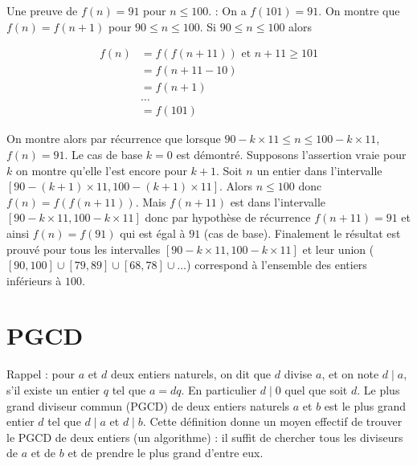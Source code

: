 \begin{newenu}
\begin{correction}
Une preuve de $f(n) = 91$ pour $n \leq 100$. :
 On a $f(101) = 91$. On montre que $f(n) = f(n + 1)$ pour $90 \leq n
  \leq 100$. Si $90 \leq n \leq 100$ alors

\begin{align*}
  f(n) &= f(f(n + 11)) \text{ et } n+11 \geq 101 \\
  &= f(n + 11 - 10) \\
  &= f(n + 1)\\
  & \ldots\\
  &= f(101)
\end{align*}

On montre alors par récurrence que lorsque $90 - k\times 11 \leq n \leq 100 - k \times 11$, $f(n) = 91$. Le cas de base $k = 0$ est démontré. Supposons l'assertion vraie pour $k$ on montre qu'elle l'est encore pour $k + 1$.  Soit $n$ un entier dans l'intervalle $[90 - (k + 1) \times 11, 100 - (k + 1) \times 11]$. Alors $n \leq 100$ donc $f(n) = f(f(n + 11))$. Mais $f(n + 11)$ est dans l'intervalle $[90 - k \times 11, 100 - k \times 11]$ donc par hypothèse de récurrence $f(n + 11) = 91$ et ainsi $f(n) = f(91)$ qui est égal à $91$ (cas de base). Finalement le résultat est prouvé pour tous les intervalles $[90 - k \times 11, 100 - k \times 11]$  et leur union ($[90,100]\cup[79,89]\cup[68,78]\cup \ldots$) correspond à l'ensemble des entiers inférieurs à $100$.

\end{correction}

\end{newenu}

\section{PGCD}
Rappel : pour $a$ et $d$ deux entiers naturels, on dit que $d$ divise $a$, et on note $d\mid a$, s'il existe un entier $q$ tel que $a = dq$. En particulier $d\mid 0$ quel que soit $d$. Le plus grand diviseur commun (PGCD) de deux entiers naturels $a$ et $b$ est le plus grand entier $d$ tel que $d\mid a$ et $d\mid b$.  Cette définition donne un moyen effectif de trouver le PGCD de deux entiers (un algorithme) : il suffit de chercher tous les diviseurs de $a$ et de $b$ et de prendre le plus grand d'entre eux. 

